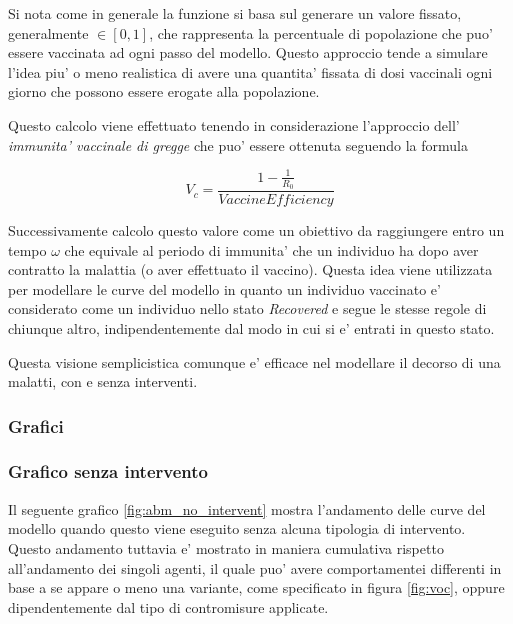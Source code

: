 Si nota come in generale la funzione si basa sul generare un valore fissato, generalmente $\in [0,1]$, che 
rappresenta la percentuale di popolazione che puo' essere vaccinata ad ogni passo del modello.
Questo approccio tende a simulare l'idea piu' o meno realistica di avere una quantita' fissata di 
dosi vaccinali ogni giorno che possono essere erogate alla popolazione. 

Questo calcolo viene effettuato tenendo in considerazione l'approccio dell' \emph{immunita' vaccinale di gregge} che puo'
essere ottenuta seguendo la formula 

$$V_c = \frac{1-\frac{1}{R_0}}{VaccineEfficiency}$$

Successivamente calcolo questo valore come un obiettivo da raggiungere entro un tempo $\omega$ che equivale al 
periodo di immunita' che un individuo ha dopo aver contratto la malattia (o aver effettuato il vaccino). 
Questa idea viene utilizzata per modellare le curve del modello in quanto un individuo vaccinato e' considerato 
come un individuo nello stato \emph{Recovered} e segue le stesse regole di chiunque altro, indipendentemente
dal modo in cui si e' entrati in questo stato. 

Questa visione semplicistica comunque e' efficace nel modellare il decorso di una malatti, con e senza interventi.

\subsubsection{Grafici}

\subsubsection*{Grafico senza intervento}
Il seguente grafico \ref{fig:abm_no_intervent} mostra l'andamento delle curve del modello
quando questo viene eseguito senza alcuna tipologia di intervento. Questo andamento tuttavia e' mostrato 
in maniera cumulativa rispetto all'andamento dei singoli agenti, il quale puo' avere comportamentei 
differenti in base a se appare o meno una variante, come specificato in figura \ref{fig:voc}, oppure 
dipendentemente dal tipo di contromisure applicate. 

